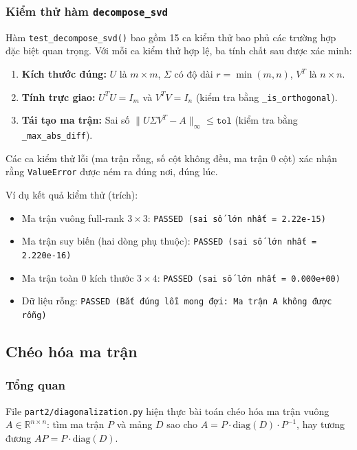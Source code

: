 \subsubsection{Kiểm thử hàm \texttt{decompose\_svd}}

Hàm \texttt{test\_decompose\_svd()} bao gồm 15 ca kiểm thử bao phủ các trường hợp đặc biệt quan trọng. Với mỗi ca kiểm thử hợp lệ, ba tính chất sau được xác minh:

\begin{enumerate}
    \item \textbf{Kích thước đúng:} $U$ là $m \times m$, $\Sigma$ có độ dài $r = \min(m,n)$, $V^T$ là $n \times n$.
    \item \textbf{Tính trực giao:} $U^T U = I_m$ và $V^T V = I_n$ (kiểm tra bằng \texttt{\_is\_orthogonal}).
    \item \textbf{Tái tạo ma trận:} Sai số $\|U \Sigma V^T - A\|_\infty \leq \texttt{tol}$ (kiểm tra bằng \texttt{\_max\_abs\_diff}).
\end{enumerate}

Các ca kiểm thử lỗi (ma trận rỗng, số cột không đều, ma trận 0 cột) xác nhận rằng \texttt{ValueError} được ném ra đúng nơi, đúng lúc.

Ví dụ kết quả kiểm thử (trích):
\begin{itemize}
    \item Ma trận vuông full-rank $3 \times 3$: \texttt{PASSED (sai số lớn nhất = 2.22e-15)}
    \item Ma trận suy biến (hai dòng phụ thuộc): \texttt{PASSED (sai số lớn nhất = 2.220e-16)}
    \item Ma trận toàn 0 kích thước $3 \times 4$: \texttt{PASSED (sai số lớn nhất = 0.000e+00)}
    \item Dữ liệu rỗng: \texttt{PASSED (Bắt đúng lỗi mong đợi: Ma trận A không được rỗng)}
\end{itemize}


\subsection{Chéo hóa ma trận}

\subsubsection{Tổng quan}

File \texttt{part2/diagonalization.py} hiện thực bài toán chéo hóa ma trận vuông $A \in \mathbb{R}^{n \times n}$: tìm ma trận $P$ và mảng $D$ sao cho $A = P \cdot \text{diag}(D) \cdot P^{-1}$, hay tương đương $AP = P \cdot \text{diag}(D)$.

